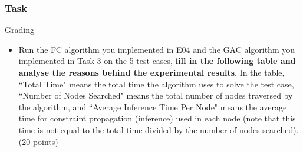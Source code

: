 \documentclass{beamer}
\begin{document}
\begin{frame}    \frametitle{Task}

  \begin{block}{Grading}
    \begin{itemize}
\item Run the FC algorithm you implemented in E04 and the GAC algorithm you implemented in Task 3 on the 5 test cases, \textbf{fill in the following table and analyse the reasons behind the experimental results}. In the table,
    ``Total Time" means the total time the algorithm uses to solve the test case,  ``Number of Nodes Searched" means the total number of nodes traversed by the algorithm, 
    and ``Average Inference Time Per Node" means the average time for constraint propagation (inference) 
used in each node (note that this time is not equal to the total time divided by the number of nodes searched). (20 points)

    \end{itemize}
  \end{block}

\end{frame}
\end{document}
